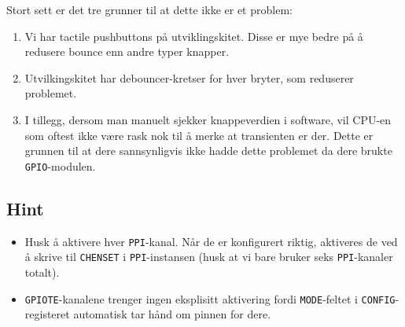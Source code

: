 Stort sett er det tre grunner til at dette ikke er et problem:

\begin{enumerate}
    \item Vi har tactile pushbuttons på utviklingskitet. Disse er mye bedre på å redusere bounce enn andre typer knapper.
    \item Utvilkingskitet har debouncer-kretser for hver bryter, som reduserer problemet.
    \item I tillegg, dersom man manuelt sjekker knappeverdien i software, vil CPU-en som oftest ikke være rask nok til å merke at transienten er der. Dette er grunnen til at dere sannsynligvis ikke hadde dette problemet da dere brukte \verb|GPIO|-modulen.
\end{enumerate}

\subsection{Hint}\label{subsec:PPI-hint}


\begin{itemize}
    \item Husk å aktivere hver \verb|PPI|-kanal. Når de er konfigurert riktig, aktiveres de ved å skrive til \verb|CHENSET| i \verb|PPI|-instansen (husk at vi bare bruker seks \verb|PPI|-kanaler totalt).
    \item \verb|GPIOTE|-kanalene trenger ingen eksplisitt aktivering fordi \verb|MODE|-feltet i \verb|CONFIG|-registeret automatisk tar hånd om pinnen for dere.
\end{itemize}
